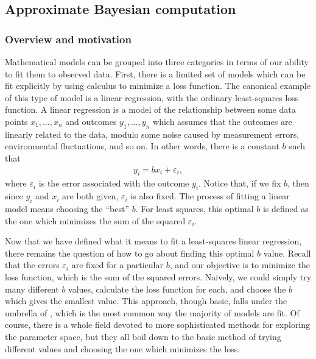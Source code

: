 \subsection{Approximate Bayesian computation}

\subsubsection{Overview and motivation}

Mathematical models can be grouped into three categories in terms of our
ability to fit them to observed data. First, there is a limited set of models
which can be fit explicitly by using calculus to minimize a loss function. The
canonical example of this type of model is a linear regression, with the
ordinary least-squares loss function. A linear regression is a model of the
relationship between some data points $x_1, \ldots, x_n$ and outcomes $y_1,
\ldots, y_n$ which assumes that the outcomes are linearly related to the data,
modulo some noise caused by measurement errors, environmental fluctuations, and
so on. In other words, there is a constant $b$ such that 
\begin{align}
  \label{eq:regression}
  y_i = bx_i + \varepsilon_i, 
\end{align}
where $\varepsilon_i$ is the error associated with the outcome $y_i$. Notice
that, if we fix $b$, then since $y_i$ and $x_i$ are both given, $\varepsilon_i$
is also fixed. The process of fitting a linear model means choosing the
``best'' $b$. For least squares, this optimal $b$ is defined as the one which
minimizes the sum of the squared $\varepsilon_i$. 

Now that we have defined what it means to fit a least-squares linear
regression, there remains the question of how to go about finding this optimal
$b$ value. Recall that the errors $\varepsilon_i$ are fixed for a particular
$b$, and our objective is to minimize the loss function, which is the sum of
the squared errors. Naively, we could simply try many different $b$ values,
calculate the loss function for each, and choose the $b$ which gives the
smallest value. This approach, though basic, falls under the umbrella of
, which is the most common way the majority of
models are fit. Of course, there is a whole field devoted to more sophisticated
methods for exploring the parameter space, but they all boil down to the basic
method of trying different values and choosing the one which minimizes the
loss.

